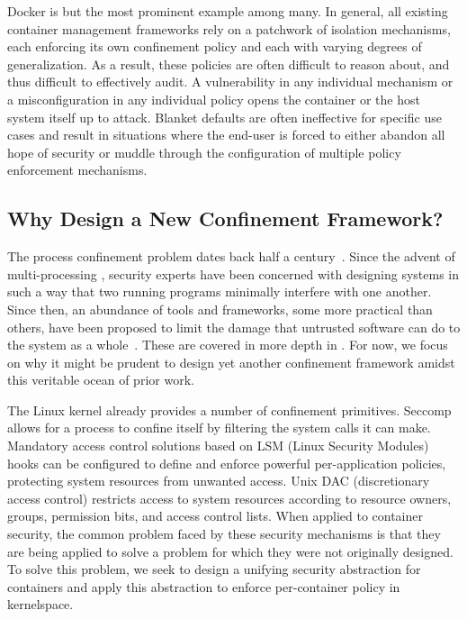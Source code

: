 Docker is but the most prominent example among many. In general, all existing container
management frameworks rely on a patchwork of isolation mechanisms, each enforcing its own
confinement policy and each with varying degrees of generalization. As a result, these
policies are often difficult to reason about, and thus difficult to effectively audit.
A vulnerability in any individual mechanism or a misconfiguration in any individual policy
opens the container or the host system itself up to attack. Blanket defaults are often
ineffective for specific use cases and result in situations where the end-user is forced to
either abandon all hope of security or muddle through the configuration of multiple policy
enforcement mechanisms.

\subsection{Why Design a New Confinement Framework?}%
\label{ss:why-new}

The process confinement problem dates back half a century~\cite{lampson1973_confinement}.
Since the advent of multi-processing ,
security experts have been concerned with designing systems in such a way that two running
programs minimally interfere with one another. Since then, an abundance of tools and
frameworks, some more practical than others, have been proposed to limit the damage that
untrusted software can do to the system as a whole~\cite{shu2016_security_isolation_study}.
These are covered in more depth in . For now, we focus on why it might be
prudent to design yet another confinement framework amidst this veritable ocean of prior work.

The Linux kernel already provides a number of confinement primitives. Seccomp allows for
a process to confine itself by filtering the system calls it can make. Mandatory access
control solutions based on LSM (Linux Security Modules) hooks can be configured to define
and enforce powerful per-application policies, protecting system resources from unwanted
access. Unix DAC (discretionary access control) restricts access to system resources
according to resource owners, groups, permission bits, and access control lists. When
applied to container security, the common problem faced by these security mechanisms is
that they are being applied to solve a problem for which they were not originally
designed. To solve this problem, we seek to design a unifying security abstraction for
containers and apply this abstraction to enforce per-container policy in kernelspace.


